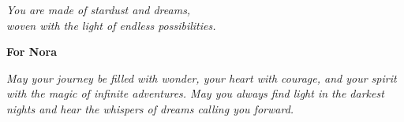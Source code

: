 \cleardoublepage

\begin{center}
    {\large \textit{You are made of stardust and dreams, \\ woven with the light of endless possibilities.}} 
    
    \vspace{1.5cm}
    
    {\Large \textbf{For Nora}} 
    
    \vspace{1cm}
    
    {\large \textit{May your journey be filled with wonder, your heart with courage, and your spirit with the magic of infinite adventures. May you always find light in the darkest nights and hear the whispers of dreams calling you forward.}}
\end{center}
